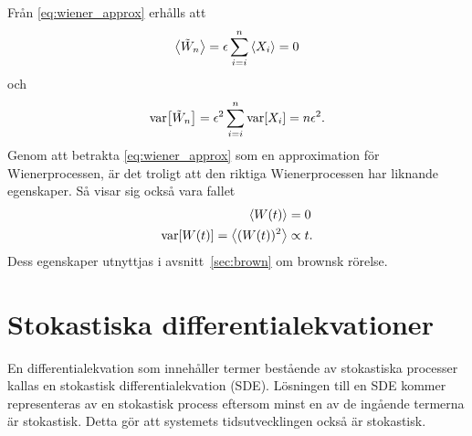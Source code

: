 Från \eqref{eq:wiener_approx} erhålls att 
\begin{equation}
\ev{\tilde{W}_n} = \epsilon\sum_{i=i}^n \ev{X_i} = 0
\end{equation}
och
\begin{equation}
\text{var}\!\left[\tilde{W}_n\right] = \epsilon^2 \sum_{i=i}^n \text{var}\!\left[X_i\right] = n\epsilon^2.
\end{equation}
Genom att betrakta \eqref{eq:wiener_approx} som en approximation för Wienerprocessen, är det troligt att den riktiga Wienerprocessen har liknande egenskaper. Så visar sig också vara fallet~\cite{Miller_probability2012}
\begin{equation}
\begin{aligned}
\ev{W(t)} &= 0\\
\VAR{ W(t) } = \ev{ (W(t))^2 } &\propto t.
\end{aligned}
\end{equation}
Dess egenskaper utnyttjas i avsnitt~\ref{sec:brown} om brownsk rörelse.














\section{Stokastiska differentialekvationer}
En differentialekvation som innehåller termer bestående av stokastiska processer kallas en stokastisk differentialekvation (SDE). Lösningen till en SDE kommer representeras av en stokastisk process eftersom minst en av de ingående termerna är stokastisk. Detta gör att systemets tidsutvecklingen också är stokastisk.

